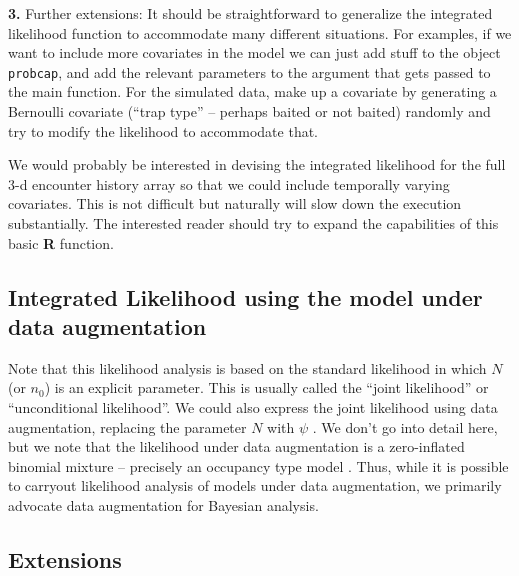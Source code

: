 {\flushleft 
{\bf 3.} 
Further extensions: It should be straightforward to
  generalize the integrated likelihood function to accommodate many
  different situations. For examples, if we want to include more
  covariates in the model we can just add stuff to the object \mbox{\tt probcap},
 and add the relevant parameters to the argument that gets
  passed to the main  function.  For the simulated data, make up a
  covariate by generating a Bernoulli covariate (``trap type'' – perhaps
  baited or not baited) randomly and try to modify the likelihood to
  accommodate that.  }

{  We would probably be interested in devising the
  integrated likelihood for the full 3-d encounter history array so
  that we could include temporally varying covariates. This is not
  difficult but naturally will slow down the execution
  substantially. The interested reader should try to expand the
  capabilities of this basic {\bf R} function.  }


\subsection{Integrated Likelihood using the model under data augmentation } 

Note that this likelihood analysis is based on the standard likelihood
in which $N$ (or $n_{0}$) is an explicit parameter. This is usually called
the ``joint likelihood'' or ``unconditional likelihood''.  We could also
express the joint likelihood using data augmentation, replacing the
parameter $N$ with $\psi$ \citep[e.g., see sec. 7.1.6][for an example]{royle_dorazio:2008}.
We don't go into detail here, but we note that the
likelihood under data augmentation is a zero-inflated binomial
mixture – precisely an occupancy type model \citep{royle:2006}.
Thus, while it is possible to carryout likelihood analysis of
models under data augmentation, we primarily advocate data
augmentation for Bayesian analysis.


\subsection{ Extensions}

